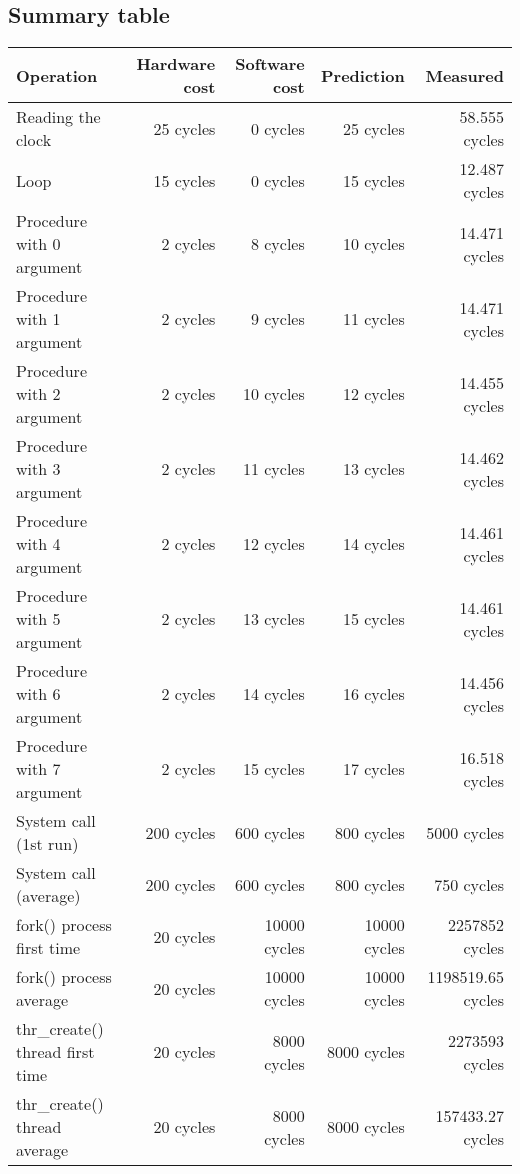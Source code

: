 \subsection{Summary table}


\begin{table}[h]
\begin{center}
\begin{tabular}{| l | r | r | r | r |} \hline
Operation 			& Hardware cost 	& Software cost 	& Prediction	& Measured \\ \hline
Reading the clock 	& 25 cycles		& 0 cycles			& 25 cycles 	& 58.555 cycles \\ \hline
Loop 				& 15 cycles 		& 0 cycles 		& 15 cycles 	& 12.487 cycles \\ \hline \hline

Procedure with 0 argument & 2 cycles 	& 8 cycles  		& 10 cycles 	& 14.471 cycles \\ \hline
Procedure with 1 argument  & 2 cycles 	& 9 cycles  		& 11 cycles 	& 14.471 cycles \\ \hline
Procedure with 2 argument  & 2 cycles 	& 10 cycles  		& 12 cycles 	& 14.455 cycles \\ \hline
Procedure with 3 argument  & 2 cycles 	& 11 cycles 		& 13 cycles 	& 14.462 cycles \\ \hline
Procedure with 4 argument  & 2 cycles 	& 12 cycles 		& 14 cycles 	& 14.461 cycles \\ \hline
Procedure with 5 argument  & 2 cycles 	& 13 cycles 		& 15 cycles 	& 14.461 cycles \\ \hline
Procedure with 6 argument  & 2 cycles 	& 14 cycles 		& 16 cycles 	& 14.456 cycles \\ \hline
Procedure with 7 argument  & 2 cycles 	& 15 cycles 		& 17 cycles 	& 16.518 cycles \\ \hline\hline

System call (1st run) & 200 cycles & 600 cycles & 800 cycles & 5000 cycles\\
\hline
System call (average) & 200 cycles & 600 cycles & 800 cycles & 750 cycles\\
\hline\hline

fork() process first time		& 20 cycles & 10000 cycles 	& 10000 cycles& 2257852 cycles \\ \hline
fork() process average		& 20 cycles & 10000 cycles 	& 10000 cycles& 1198519.65 cycles \\ \hline
thr\_create() thread first time	& 20 cycles & 8000 cycles		& 8000 cycles &  2273593 cycles \\ \hline
thr\_create() thread 	average	& 20 cycles & 8000 cycles		& 8000 cycles &  157433.27 cycles \\ \hline\hline



\end{tabular}
\end{center}
\end{table}
